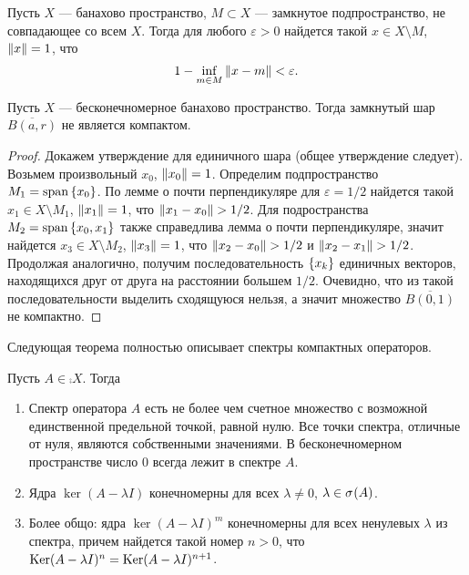 \begin{lemma}
    Пусть $X$ --- банахово пространство, $M \subset X$ --- замкнутое подпространство,
    не совпадающее со всем $X$. Тогда
    для любого $\varepsilon > 0$ найдется такой $x \in X \setminus M$, $\left\|x\right\| = 1$, что
    \[ 1 - \inf_{m\in M} \left\|x - m\right\| < \varepsilon. \]
\end{lemma}

\begin{theorem}[Рисса]
    Пусть $X$ --- бесконечномерное банахово пространство. Тогда замкнутый шар 
    $\overline{B(a, r)}$ не является компактом.
\end{theorem}

\begin{proof}
    Докажем утверждение для единичного шара (общее утверждение следует). Возьмем произвольный
    $x_0$, $\left\|x_0\right\| = 1$. Определим подпространство $M_1 = \operatorname{span}\left\{x_0\right\}$. 
    По лемме о почти перпендикуляре для $\varepsilon = 1/2$ найдется такой 
    $x_1 \in X \setminus M_1$, $\left\|x_1\right\| = 1$, что
    $\left\|x_1 - x_0\right\| > 1/2$. Для подространства $M_2 = \operatorname{span}\left\{x_0, x_1\right\}$ также 
    справедлива лемма о почти перпендикуляре, значит найдется $x_3 \in X \setminus M_2$, 
    $\left\|x_3\right\| = 1$, что $\left\|x_2 - x_0\right\| > 1/2$ и $\left\|x_2 - x_1\right\| > 1/2$. Продолжая аналогично, получим
    последовательность $\left\{x_k\right\}$ единичных векторов, находящихся друг от друга на расстоянии 
    большем $1/2$.
    Очевидно, что из такой последовательности выделить сходящуюся нельзя, а значит множество 
    $\overline{B(0, 1)}$ не компактно.
\end{proof}

Следующая теорема полностью описывает спектры компактных операторов.

\begin{theorem}
    Пусть $A \in \comp{X}$. Тогда
    \begin{enumerate}
        \item Спектр оператора $A$ есть не более чем счетное множество с возможной единственной
        предельной точкой, равной нулю. Все точки спектра, отличные от нуля, являются собственными
        значениями. В бесконечномерном пространстве число $0$ всегда лежит в спектре $A$.
        \item Ядра $\ker(A- \lambda I)$ конечномерны для всех $\lambda \neq 0$, 
        $\lambda \in \spectrum{A}$.
        \item Более общо: ядра $\ker (A - \lambda I)^m$ конечномерны для всех ненулевых $\lambda$
        из спектра, причем найдется такой номер $n > 0$, что 
        $\ker (A - \lambda I)^n \hm= \ker (A - \lambda I)^{n+1}$.
    \end{enumerate}
\end{theorem}

